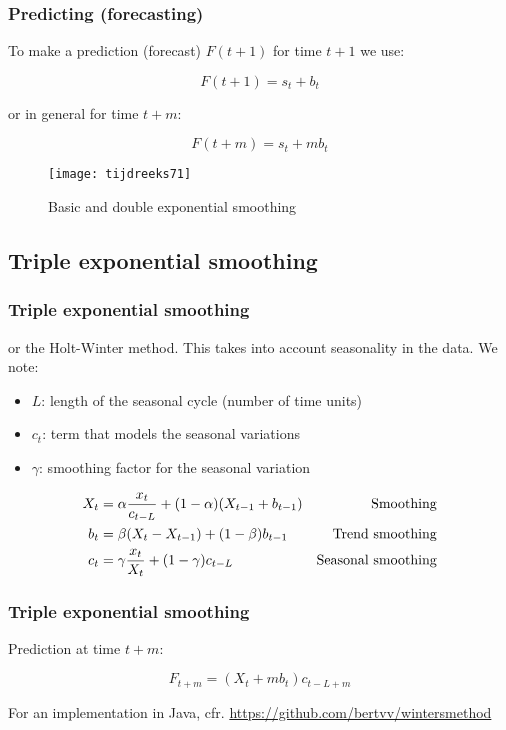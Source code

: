 \documentclass[aspectratio=169]{beamer}
\begin{document}
\begin{frame}
  \frametitle{Predicting (forecasting)}
  
  To make a prediction (forecast) $F(t+1)$ for time $t+1$ we use:
  
  \[ F(t+1) = s_t + b_t \]
  
  or in general for time $t+m$:
  
  \[ F(t+m) = s_t + m b_t \]
\end{frame}

\begin{frame}
  \begin{figure}
    \centering
    \texttt{[image: tijdreeks71]}
    \caption{Basic and double exponential smoothing}
    \label{fig:tijdreeks71}
  \end{figure}
\end{frame}

\subsection{Triple exponential smoothing}

\begin{frame}
  \frametitle{Triple exponential smoothing}
  
  or the Holt-Winter method. This takes into account seasonality in the data. We note:
  
  \begin{itemize}
    \item $L$: length of the seasonal cycle (number of time units)
    \item $c_t$: term that models the seasonal variations
    \item $\gamma$: smoothing factor for the seasonal variation
  \end{itemize}
  
  \begin{align*}
  X_{t} &= \alpha \frac{x_{t}}{c_{t-L}} + (1-\alpha) (X_{t-1} + b_{t-1}) & \textnormal{Smoothing}\\
  b_{t} &= \beta (X_{t} - X_{t-1}) + (1-\beta)b_{t-1} & \textnormal{Trend smoothing} \\
  c_{t} &= \gamma \frac{x_{t}}{X_{t}} + (1-\gamma)c_{t-L} & \textnormal{Seasonal smoothing} \\
  \label{eq:HoltWinters}
  \end{align*}
  
\end{frame}

\begin{frame}
  \frametitle{Triple exponential smoothing}
  
  Prediction at time $t + m$:
  
  \[ F_{t+m} = (X_{t} + mb_{t})c_{t-L+m} \]
  
  For an implementation in Java, cfr. \url{https://github.com/bertvv/wintersmethod}
\end{frame}
\end{document}
